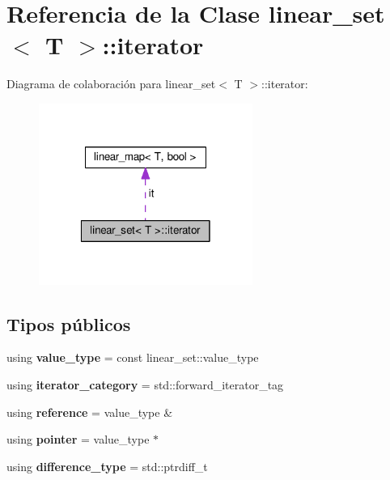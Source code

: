 \hypertarget{classlinear__set_1_1iterator}{\section{Referencia de la Clase linear\-\_\-set$<$ T $>$\-:\-:iterator}
\label{classlinear__set_1_1iterator}
}


Diagrama de colaboración para linear\-\_\-set$<$ T $>$\-:\-:iterator\-:\nopagebreak
\begin{figure}[H]
\begin{center}
\leavevmode
\includegraphics[width=198pt]{classlinear__set_1_1iterator__coll__graph}
\end{center}
\end{figure}
\subsection*{Tipos públicos}
\begin{DoxyCompactItemize}
\item 
\hypertarget{classlinear__set_1_1iterator_adc428ae224f2e66cded571df340b814e}{using {\bfseries value\-\_\-type} = const linear\-\_\-set\-::value\-\_\-type}\label{classlinear__set_1_1iterator_adc428ae224f2e66cded571df340b814e}

\item 
\hypertarget{classlinear__set_1_1iterator_ac70b54cbde97e1a59bc002979633aa41}{using {\bfseries iterator\-\_\-category} = std\-::forward\-\_\-iterator\-\_\-tag}\label{classlinear__set_1_1iterator_ac70b54cbde97e1a59bc002979633aa41}

\item 
\hypertarget{classlinear__set_1_1iterator_a1394508ada8427ad0b5764794ea59473}{using {\bfseries reference} = value\-\_\-type \&}\label{classlinear__set_1_1iterator_a1394508ada8427ad0b5764794ea59473}

\item 
\hypertarget{classlinear__set_1_1iterator_a4334a22789e11ff18a1b31982a20f944}{using {\bfseries pointer} = value\-\_\-type $\ast$}\label{classlinear__set_1_1iterator_a4334a22789e11ff18a1b31982a20f944}

\item 
\hypertarget{classlinear__set_1_1iterator_aca6addc2ad85f15d075c225c4ad3a085}{using {\bfseries difference\-\_\-type} = std\-::ptrdiff\-\_\-t}\label{classlinear__set_1_1iterator_aca6addc2ad85f15d075c225c4ad3a085}

\end{DoxyCompactItemize}
